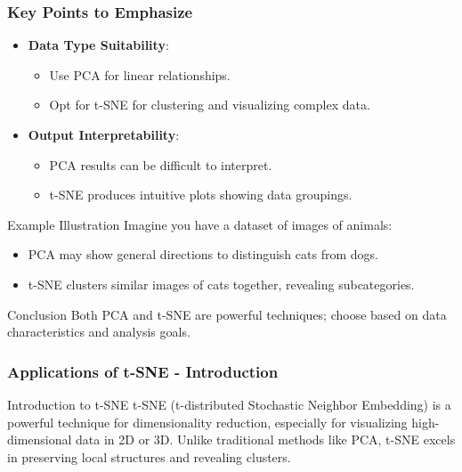 \documentclass[aspectratio=169]{beamer}
\begin{document}
\begin{frame}[fragile]
    \frametitle{Key Points to Emphasize}
    \begin{itemize}
        \item \textbf{Data Type Suitability}:
            \begin{itemize}
                \item Use PCA for linear relationships.
                \item Opt for t-SNE for clustering and visualizing complex data.
            \end{itemize}
        \item \textbf{Output Interpretability}:
            \begin{itemize}
                \item PCA results can be difficult to interpret.
                \item t-SNE produces intuitive plots showing data groupings.
            \end{itemize}
    \end{itemize}

    \begin{block}{Example Illustration}
        Imagine you have a dataset of images of animals:
        \begin{itemize}
            \item PCA may show general directions to distinguish cats from dogs.
            \item t-SNE clusters similar images of cats together, revealing subcategories.
        \end{itemize}
    \end{block}

    \begin{block}{Conclusion}
        Both PCA and t-SNE are powerful techniques; choose based on data characteristics and analysis goals.
    \end{block}
\end{frame}

\begin{frame}[fragile]
    \frametitle{Applications of t-SNE - Introduction}
    \begin{block}{Introduction to t-SNE}
        t-SNE (t-distributed Stochastic Neighbor Embedding) is a powerful technique for dimensionality reduction, especially for visualizing high-dimensional data in 2D or 3D. 
        Unlike traditional methods like PCA, t-SNE excels in preserving local structures and revealing clusters.
    \end{block}
\end{frame}
\end{document}
